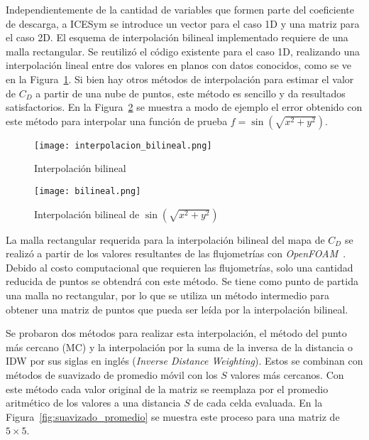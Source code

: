 
Independientemente de la cantidad de variables que formen parte del coeficiente
de descarga, a ICESym se introduce un vector para el caso 1D y una matriz para
el caso 2D.
%
El esquema de interpolación bilineal implementado requiere de una malla
rectangular.
%
Se reutilizó el código existente para el caso 1D, realizando una interpolación
lineal entre dos valores en planos con datos conocidos, como se ve en la
Figura~\ref{fig:interp_bilineal}.
%
Si bien hay otros métodos de interpolación para estimar el valor de $C_D$ a
partir de una nube de puntos, este método es sencillo y da resultados
satisfactorios.
%
En la Figura~\ref{fig:bilineal} se muestra a modo de ejemplo el error obtenido
con este método para interpolar una función de prueba
$f=\sin\left(\sqrt{x^2 + y^2}\right)$.

\begin{figure}
    \centering
    \texttt{[image: interpolacion\_bilineal.png]}
    \caption{Interpolación bilineal\protect\footnotemark}\label{fig:interp_bilineal}
\end{figure}

\begin{figure}
    \centering
    \texttt{[image: bilineal.png]}
    \caption{Interpolación bilineal de $\sin(\sqrt{x^2 + y^2})$}\label{fig:bilineal}
\end{figure}

La malla rectangular requerida para la interpolación bilineal del mapa de
$C_{D}$ se realizó a partir de los valores resultantes de las flujometrías con
\emph{OpenFOAM}~\parencite{openfoam}.
%
Debido al costo computacional que requieren las flujometrías, solo una cantidad
reducida de puntos se obtendrá con este método.
%
Se tiene como punto de partida una malla no rectangular, por lo que se utiliza
un método intermedio para obtener una matriz de puntos que pueda ser leída por
la interpolación bilineal.

Se probaron dos métodos para realizar esta interpolación, el método del punto más
cercano (MC) y la interpolación por la suma de la inversa de la distancia o IDW por
sus siglas en inglés (\emph{Inverse Distance Weighting}).
%
Estos se combinan con métodos de suavizado de promedio móvil con los $S$ valores
más cercanos.
%
Con este método cada valor original de la matriz se reemplaza por el promedio
aritmético de los valores a una distancia $S$ de cada celda evaluada.
%
En la Figura~\ref{fig:suavizado_promedio} se muestra este proceso para una
matriz de $5\times5$.

